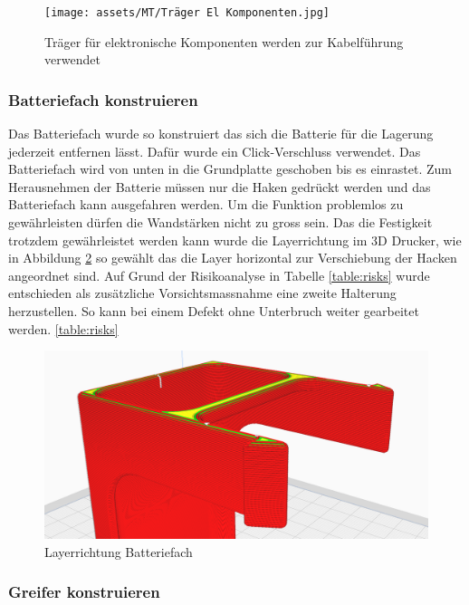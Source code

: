\begin{figure}[H]
\centering
\texttt{[image: assets/MT/Träger El Komponenten.jpg]}
\caption{Träger für elektronische Komponenten werden zur Kabelführung verwendet}
\label{fig: Träger für elektronische Komponenten}
\end{figure}

\subsubsection{Batteriefach konstruieren}
\label{Batteriefach konstruieren}

Das Batteriefach wurde so konstruiert das sich die Batterie für die Lagerung jederzeit entfernen lässt. Dafür wurde ein Click-Verschluss verwendet. Das Batteriefach wird von unten in die Grundplatte geschoben bis es einrastet. Zum Herausnehmen der Batterie müssen nur die Haken gedrückt werden und das Batteriefach kann ausgefahren werden. Um die Funktion problemlos zu gewährleisten dürfen die Wandstärken nicht zu gross sein. Das die Festigkeit trotzdem gewährleistet werden kann wurde die Layerrichtung im 3D Drucker, wie in Abbildung \ref{Layerrichtung Batteriefach} so gewählt das die Layer horizontal zur Verschiebung der Hacken angeordnet sind. Auf Grund der Risikoanalyse in Tabelle \ref{table:risks} wurde entschieden als zusätzliche Vorsichtsmassnahme eine zweite Halterung herzustellen. So kann bei einem Defekt ohne Unterbruch weiter gearbeitet werden. \ref{table:risks}


\begin{figure}[H]
\centering
\includegraphics[width=\textwidth]{assets/MT/Layer_Batterie Fach.png}
\caption{Layerrichtung Batteriefach}
\label{Layerrichtung Batteriefach}
\end{figure}

\subsubsection{Greifer konstruieren}
\label{Greifer konstruieren}

